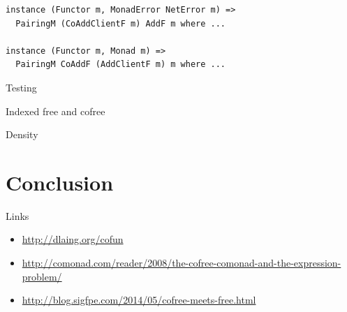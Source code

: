 \documentclass{beamer}
\begin{document}
\begin{frame}[fragile]
  \begin{verbatim}
instance (Functor m, MonadError NetError m) =>
  PairingM (CoAddClientF m) AddF m where ...

instance (Functor m, Monad m) =>
  PairingM CoAddF (AddClientF m) m where ...
  \end{verbatim}
\end{frame}

\begin{frame}[c]
  \centering
  Testing
\end{frame}

\begin{frame}[c]
  \centering
  Indexed free and cofree
\end{frame}

\begin{frame}[c]
  \centering
  Density
\end{frame}

\section{Conclusion}

\begin{frame}[c]
  \centering
  Links
  \begin{itemize}
  \item<1-> \href{http://dlaing.org/cofun}{http://dlaing.org/cofun}
  \item<2-> \href{http://comonad.com/reader/2008/the-cofree-comonad-and-the-expression-problem/}{http://comonad.com/reader/2008/the-cofree-comonad-and-the-expression-problem/}
  \item<3-> \href{http://blog.sigfpe.com/2014/05/cofree-meets-free.html}{http://blog.sigfpe.com/2014/05/cofree-meets-free.html}
  \end{itemize}
\end{frame}
\end{document}

